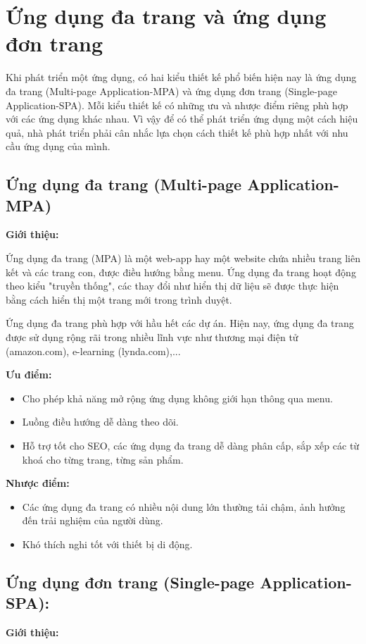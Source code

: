 \section{Ứng dụng đa trang và ứng dụng đơn trang}
Khi phát triển một ứng dụng, có hai kiểu thiết kế phổ biến hiện nay là ứng dụng đa trang (Multi-page Application-MPA) và ứng dụng đơn trang (Single-page Application-SPA). Mỗi kiểu thiết kế có những ưu và nhược điểm riêng phù hợp với các ứng dụng khác nhau. Vì vậy để có thể phát triển ứng dụng một cách hiệu quả, nhà phát triển phải cân nhắc lựa chọn cách thiết kế phù hợp nhất với nhu cầu ứng dụng của mình.
\subsection{Ứng dụng đa trang (Multi-page Application-MPA)}
\textbf{Giới thiệu:}

Ứng dụng đa trang (MPA) là một web-app hay một website chứa nhiều trang liên kết và các trang con, được điều hướng bằng menu. Ứng dụng đa trang hoạt động theo kiểu "truyền thống", các thay đổi như hiển thị dữ liệu sẽ được thực hiện bằng cách hiển thị một trang mới trong trình duyệt.

Ứng dụng đa trang phù hợp với hầu hết các dự án. Hiện nay, ứng dụng đa trang được sử dụng rộng rãi trong nhiều lĩnh vực như thương mại điện tử (amazon.com), e-learning (lynda.com),...

\textbf{Ưu điểm:}
\begin{itemize}
    \item Cho phép khả năng mở rộng ứng dụng không giới hạn thông qua menu.
    \item Luồng điều hướng dễ dàng theo dõi. 
    \item Hỗ trợ tốt cho SEO, các ứng dụng đa trang dễ dàng phân cấp, sắp xếp các từ khoá cho từng trang, từng sản phẩm.
\end {itemize}

\textbf{Nhược điểm:}

\begin{itemize}
    \item Các ứng dụng đa trang có nhiều nội dung lớn thường tải chậm, ảnh hưởng đến trải nghiệm của người dùng.
    \item Khó thích nghi tốt với thiết bị di động.
\end {itemize}
\subsection{Ứng dụng đơn trang (Single-page Application-SPA):}
\textbf{Giới thiệu:}

